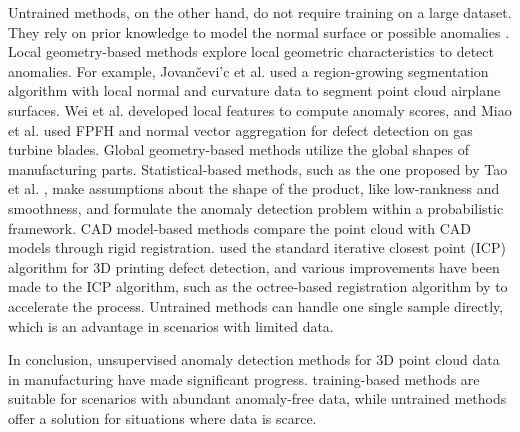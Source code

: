Untrained methods, on the other hand, do not require training on a large dataset. 
They rely on prior knowledge to model the normal surface or possible anomalies \cite{jovancevic_3d_2017}. Local geometry-based methods explore local geometric characteristics to detect anomalies. For example, Jovan\v{c}evi'{c} et al. \cite{jovancevic_3d_2017} used a region-growing segmentation algorithm with local normal and curvature data to segment point cloud airplane surfaces. Wei et al. \cite{wei_microhardness_2021} developed local features to compute anomaly scores, and Miao et al. \cite{miao_pipeline_2022} used FPFH and normal vector aggregation for defect detection on gas turbine blades. 
Global geometry-based methods utilize the global shapes of manufacturing parts. Statistical-based methods, such as the one proposed by Tao et al. \cite{tao2023anomaly}, make assumptions about the shape of the product, like low-rankness and smoothness, and formulate the anomaly detection problem within a probabilistic framework. CAD model-based methods compare the point cloud with CAD models through rigid registration. \cite{zhao_defect_2023} used the standard iterative closest point (ICP) algorithm for 3D printing defect detection, and various improvements have been made to the ICP algorithm, such as the octree-based registration algorithm by \cite{he_octree-based_2023} to accelerate the process. Untrained methods can handle one single sample directly, which is an advantage in scenarios with limited data.

In conclusion, unsupervised anomaly detection methods for 3D point cloud data in manufacturing have made significant progress. training-based methods are suitable for scenarios with abundant anomaly-free data, while untrained methods offer a solution for situations where data is scarce. 